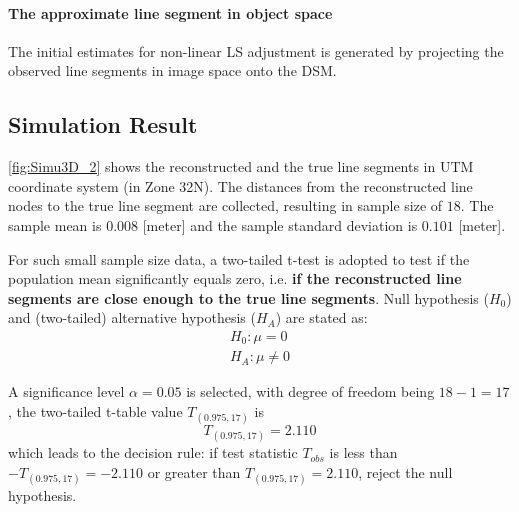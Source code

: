 \paragraph{The approximate line segment in object space}
The initial estimates for non-linear LS adjustment is generated by projecting the observed line segments in image space onto the DSM.

\subsection{Simulation Result}
\label{subsec:simuresult}



\cref{fig:Simu3D_2} shows the reconstructed and the true line segments in UTM coordinate system (in Zone 32N). The distances from the reconstructed line nodes to the true line segment are collected, resulting in sample size of $18$. The sample mean is $0.008$ [meter] and the sample standard deviation is $0.101$ [meter]. %

For such small sample size data, a two-tailed t-test is adopted to test if the population mean significantly equals zero, i.e. \textbf{if the reconstructed line segments are close enough to the true line segments}. Null hypothesis ($H_0$) and (two-tailed) alternative hypothesis ($H_A$) are stated as:
\begin{equation*}
\begin{split}
H_0: \mu=0\\
H_A: \mu\neq0
\end{split}
\end{equation*}

A significance level $\alpha=0.05$ is selected, with degree of freedom being $18-1=17$, the two-tailed t-table value $T_{(0.975,17)}$ is
\begin{equation*}
T_{(0.975,17)}=2.110
\end{equation*}
which leads to the decision rule: if test statistic $T_{obs}$ is less than $-T_{(0.975,17)}=-2.110$ or greater than $T_{(0.975,17)}=2.110$, reject the null hypothesis.

